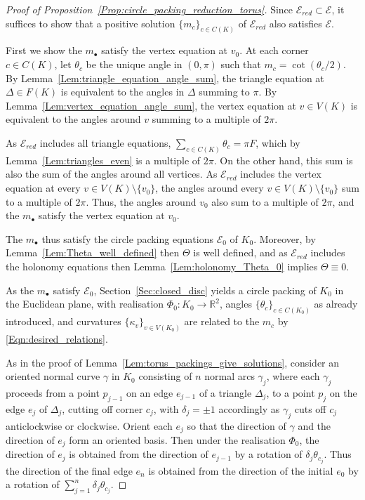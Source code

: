\documentclass[12pt]{amsart}
\numberwithin{equation}{section}
\theoremstyle{named}
\newcommand{\refsec}[1]{Section~\ref{Sec:#1}}
\newcommand{\refeqn}[1]{\eqref{Eqn:#1}}
\newcommand{\reflem}[1]{Lemma~\ref{Lem:#1}}
\newcommand{\refprop}[1]{Proposition~\ref{Prop:#1}}
\newcommand{\R}{\mathbb{R}}
\newcommand{\To}{\longrightarrow}
\begin{document}
\begin{proof}[Proof of \refprop{circle_packing_reduction_torus}]
Since $\mathcal{E}_{red} \subset \mathcal{E}$, it suffices to show that a positive solution $\{m_{c}\}_{c \in C(K)}$ of $\mathcal{E}_{red}$ also satisfies $\mathcal{E}$.

First we show the $m_\bullet$ satisfy the vertex equation at $v_0$. At each corner $c \in C(K)$, let $\theta_c$ be the unique angle in $(0, \pi)$ such that $m_c = \cot (\theta_c / 2)$. By \reflem{triangle_equation_angle_sum}, the triangle equation at $\Delta \in F(K)$ is equivalent to the angles in $\Delta$ summing to $\pi$. By \reflem{vertex_equation_angle_sum}, the vertex equation at $v \in V(K)$ is equivalent to the angles around $v$ summing to a multiple of $2\pi$.

As $\mathcal{E}_{red}$ includes all triangle equations, $\sum_{c \in C(K)} \theta_c = \pi F$, which by \reflem{triangles_even} is a multiple of $2\pi$. On the other hand, this sum is also the sum of the angles around all vertices. As $\mathcal{E}_{red}$ includes the vertex equation at every $v \in V(K) \setminus \{v_0\}$, the angles around every $v \in V(K) \setminus \{v_0\}$ sum to a multiple of $2\pi$. Thus, the angles around $v_0$ also sum to a multiple of $2\pi$, and the $m_\bullet$ satisfy the vertex equation at $v_0$. 

The $m_\bullet$ thus satisfy the circle packing equations $\mathcal{E}_0$ of $K_0$. Moreover, by \reflem{Theta_well_defined} then $\Theta$ is well defined, and as $\mathcal{E}_{red}$ includes the holonomy equations then \reflem{holonomy_Theta_0} implies $\Theta \equiv 0$.

As the $m_\bullet$ satisfy $\mathcal{E}_0$, \refsec{closed_disc} yields a circle packing of $K_0$ in the Euclidean plane, with realisation $\Phi_0 \colon K_0 \To \R^2$, angles $\{\theta_c\}_{c \in C(K_0)}$ as already introduced, and curvatures $\{\kappa_v\}_{v \in V(K_0)}$ are related to the $m_c$ by \refeqn{desired_relations}.

As in the proof of \reflem{torus_packings_give_solutions}, consider an oriented normal curve $\gamma$ in $K_0$ consisting of $n$ normal arcs $\gamma_j$, where each $\gamma_j$ proceeds from a point $p_{j-1}$ on an edge $e_{j-1}$ of a triangle $\Delta_j$, to a point $p_j$ on the edge $e_j$ of $\Delta_j$, cutting off corner $c_j$, with $\delta_j = \pm 1$ accordingly as $\gamma_j$ cuts off $c_j$ anticlockwise or clockwise. Orient each $e_j$ so that the direction of $\gamma$ and the direction of $e_j$ form an oriented basis. Then under the realisation $\Phi_0$, the direction of $e_j$ is obtained from the direction of $e_{j-1}$ by a rotation of $\delta_j \theta_{c_j}$. Thus the direction of the final edge $e_n$ is obtained from the direction of the initial $e_0$ by a rotation of $\sum_{j=1}^n \delta_j \theta_{c_j}$.


\end{proof}
\end{document}
